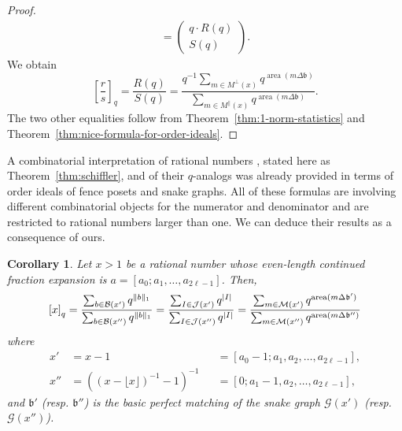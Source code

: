 \documentclass[a4paper,12pt]{amsart}
\newtheorem{corollary}[definition]{Corollary}
\newcommand{\xx}{{x}}
\newcommand{\Bcal}{{\mathcal{B}}}
\newcommand{\Gcal}{{\mathcal{G}}}
\newcommand{\Jcal}{{\mathcal{J}}}
\newcommand{\Mcal}{{\mathcal{M}}}
\newcommand{\bfrak}{{\mathfrak{b}}}
\newcommand{\0}{\mathtt{0}}
\newcommand{\1}{\mathtt{1}}
\newcommand{\2}{\mathtt{2}}
\newcommand{\3}{\mathtt{3}}
\newcommand{\carreplein}{{\perp}}
\newcommand{\carrevide}{{\parallel}}
\DeclareMathOperator{\area}{area}
\newcommand{\size}[1]{
    {|#1|}                 %
}
\begin{document}
\begin{proof}
\begin{align*}
        =
        \left(\begin{array}{c} q\cdot R(q) \\ S(q) \end{array}\right).
    \end{align*}
    We obtain
    \[
        \left[\frac{r}{s}\right]_q
        = \frac{R(q)}{S(q)}
        = \frac{q^{-1}\sum_{m\in M^\carreplein(\xx)} q^{\area(m\Delta\bfrak)}}
                     {\sum_{m\in M^\carrevide (\xx)} q^{\area(m\Delta\bfrak)}}.
    \]
    The two other equalities follow from
    Theorem~\ref{thm:1-norm-statistics} and
    Theorem~\ref{thm:nice-formula-for-order-ideals}.
\end{proof}

A combinatorial interpretation of rational numbers
\cite[Theorem 3.4]{MR3778183},
stated here as Theorem~\ref{thm:schiffler},
%
and of their $q$-analogs
\cite[Theorem 4]{MR4073883}
was already provided
in terms of order ideals of fence posets and snake graphs.
All of these formulas are involving different combinatorial
objects for the numerator and denominator
and are restricted to rational numbers larger than one.
We can deduce their results as a consequence of ours.

\begin{corollary}\label{cor:the-usual-combinatorial-interpretation}
    Let $\xx>1$ be a rational number
    whose even-length continued fraction expansion
    is $a=[a_0;a_1,\dots,a_{2\ell-1}]$.
    Then,
    \begin{equation} \label{eq:usual-combinatorial-interpretations}
\left[\xx\right]_q
=
    \frac{\sum_{b\in \Bcal(\xx')} q^{\Vert b\Vert_1}}
     {\sum_{b\in \Bcal(\xx'')  } q^{\Vert b\Vert_1}}
=
    \frac{\sum_{I\in \Jcal(\xx')} q^{\size{I}}}
     {\sum_{I\in \Jcal(\xx'')  } q^{\size{I}}}
=
    \frac{\sum_{m\in \Mcal(\xx')} q^{\area(m\Delta\bfrak')}}
     {\sum_{m\in \Mcal(\xx'')  } q^{\area(m\Delta\bfrak'')}}
\end{equation}
    where
    \begin{align*}
        \xx' &=\xx-1&&=[a_0-1;a_1,a_2,\dots,a_{2\ell-1}],\\
        \xx''&=((\xx-\lfloor \xx\rfloor)^{-1}-1)^{-1}&&=[0;a_1-1,a_2,\dots,a_{2\ell-1}],
    \end{align*}
          and $\bfrak'$ (resp. $\bfrak''$)
          is the basic perfect matching of the snake graph
          $\Gcal(\xx')$ (resp. $\Gcal(\xx'')$).
\end{corollary}
\end{document}
